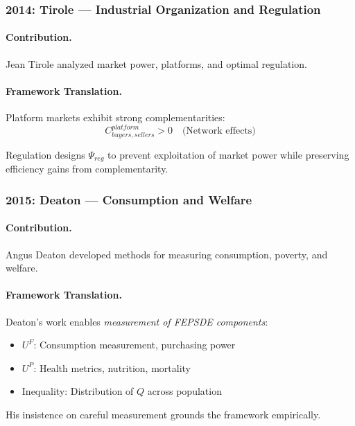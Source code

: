 \documentclass[12pt,a4paper]{article}
\begin{document}
\subsubsection{2014: Tirole --- Industrial Organization and Regulation}

\paragraph{Contribution.}
Jean Tirole \citep{tirole1988} analyzed market power, platforms, and optimal regulation.

\paragraph{Framework Translation.}
Platform markets exhibit strong complementarities:
\begin{equation}
  C_{buyers, sellers}^{platform} > 0 \quad \text{(Network effects)}
\end{equation}

Regulation designs $\Psi_{reg}$ to prevent exploitation of market power
while preserving efficiency gains from complementarity.

\subsubsection{2015: Deaton --- Consumption and Welfare}

\paragraph{Contribution.}
Angus Deaton developed methods for measuring consumption, poverty, and welfare.

\paragraph{Framework Translation.}
Deaton's work enables \emph{measurement of FEPSDE components}:
\begin{itemize}
  \item $U^F$: Consumption measurement, purchasing power
  \item $U^P$: Health metrics, nutrition, mortality
  \item Inequality: Distribution of $Q$ across population
\end{itemize}

His insistence on careful measurement grounds the framework empirically.
\end{document}
